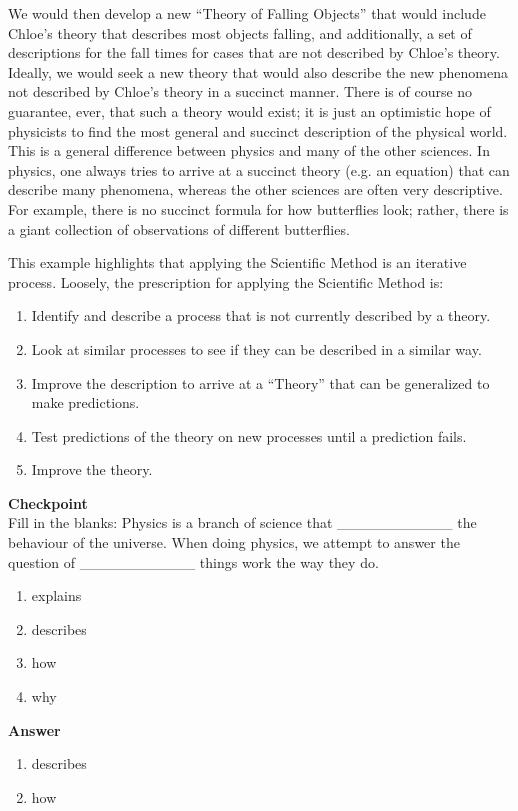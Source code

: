 \documentclass[9pt,Preprint]{lapreprint}
\begin{document}
We would then develop a new ``Theory of Falling Objects'' that would include Chloe's theory that describes most objects falling, and additionally, a set of descriptions for the fall times for cases that are not described by Chloe's theory. Ideally, we would seek a new theory that would also describe the new phenomena not described by Chloe's theory in a succinct manner. There is of course no guarantee, ever, that such a theory would exist; it is just an optimistic hope of physicists to find the most general and succinct description of the physical world. This is a general difference between physics and many of the other sciences. In physics, one always tries to arrive at a succinct theory (e.g. an equation) that can describe many phenomena, whereas the other sciences are often very descriptive. For example, there is no succinct formula for how butterflies look; rather, there is a giant collection of observations of different butterflies.

This example highlights that applying the Scientific Method is an iterative process. Loosely, the prescription for applying the Scientific Method is:

\begin{enumerate}
\item Identify and describe a process that is not currently described by a theory.
\item Look at similar processes to see if they can be described in a similar way.
\item Improve the description to arrive at a ``Theory'' that can be generalized to make predictions.
\item Test predictions of the theory on new processes until a prediction fails.
\item Improve the theory.
\end{enumerate}

\begin{framed}
\textbf{Checkpoint}\\
Fill in the blanks: Physics is a branch of science that \_\_\_\_\_\_\_\_\_\_\_ the behaviour of the universe. When doing physics, we attempt to answer the question of \_\_\_\_\_\_\_\_\_\_\_ things work the way they do.

\begin{enumerate}
\item explains
\item describes
\item how
\item why
\end{enumerate}

\begin{framed}
\textbf{Answer}\\
\begin{enumerate}
\item describes
\item how
\end{enumerate}
\end{framed}
\end{framed}
\end{document}
